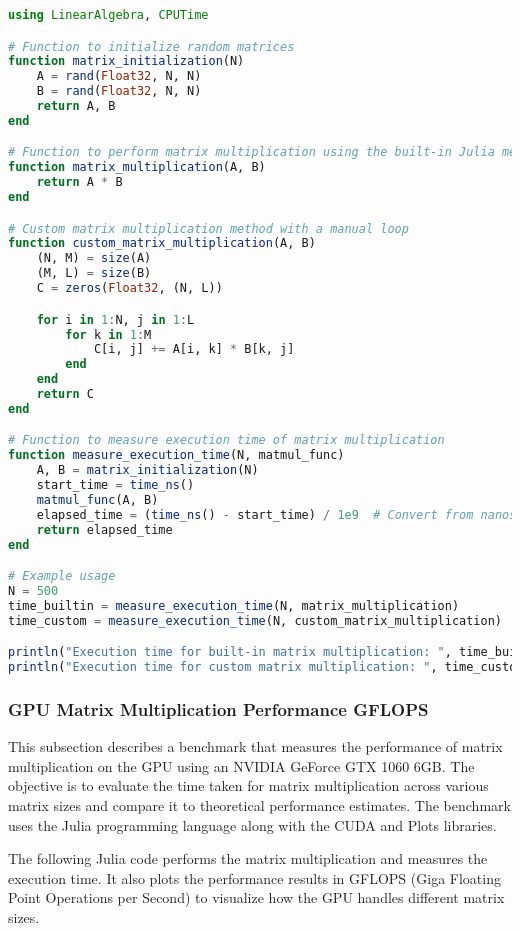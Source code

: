 \begin{lstlisting}[language=Julia]
using LinearAlgebra, CPUTime

# Function to initialize random matrices
function matrix_initialization(N)
    A = rand(Float32, N, N)
    B = rand(Float32, N, N)
    return A, B
end

# Function to perform matrix multiplication using the built-in Julia method
function matrix_multiplication(A, B)
    return A * B
end

# Custom matrix multiplication method with a manual loop
function custom_matrix_multiplication(A, B)
    (N, M) = size(A)
    (M, L) = size(B)
    C = zeros(Float32, (N, L))

    for i in 1:N, j in 1:L
        for k in 1:M
            C[i, j] += A[i, k] * B[k, j]
        end
    end
    return C
end

# Function to measure execution time of matrix multiplication
function measure_execution_time(N, matmul_func)
    A, B = matrix_initialization(N)
    start_time = time_ns()
    matmul_func(A, B)
    elapsed_time = (time_ns() - start_time) / 1e9  # Convert from nanoseconds to seconds
    return elapsed_time
end

# Example usage
N = 500
time_builtin = measure_execution_time(N, matrix_multiplication)
time_custom = measure_execution_time(N, custom_matrix_multiplication)

println("Execution time for built-in matrix multiplication: ", time_builtin, " seconds")
println("Execution time for custom matrix multiplication: ", time_custom, " seconds")
\end{lstlisting}


\newpage

\subsubsection{GPU Matrix Multiplication Performance GFLOPS}

This subsection describes a benchmark that measures the performance of matrix multiplication on the GPU using an NVIDIA GeForce GTX 1060 6GB. The objective is to evaluate the time taken for matrix multiplication across various matrix sizes and compare it to theoretical performance estimates. The benchmark uses the Julia programming language along with the CUDA and Plots libraries.

The following Julia code performs the matrix multiplication and measures the execution time. It also plots the performance results in GFLOPS (Giga Floating Point Operations per Second) to visualize how the GPU handles different matrix sizes.

